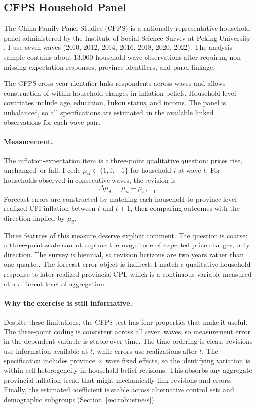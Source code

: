 \subsection{CFPS Household Panel}

The China Family Panel Studies (CFPS) is a nationally
representative household panel administered by the Institute
of Social Science Survey at Peking University
\citep{Xie2014,Xie2022}. I use seven waves (2010, 2012,
2014, 2016, 2018, 2020, 2022). The analysis sample contains
about 13,000 household-wave observations after requiring
non-missing expectation responses, province identifiers, and
panel linkage.

The CFPS cross-year identifier links respondents across
waves and allows construction of within-household changes in
inflation beliefs. Household-level covariates include age,
education, hukou status, and income. The panel is
unbalanced, so all specifications are estimated on the
available linked observations for each wave pair.

\paragraph{Measurement.}
The inflation-expectation item is a three-point qualitative
question: prices rise, unchanged, or fall. I code
$\mu_{it}\in\{1,0,-1\}$ for household $i$ at wave $t$. For
households observed in consecutive waves, the revision is
\begin{equation*}
\Delta \mu_{it}=\mu_{it}-\mu_{i,t-1}.
\end{equation*}
Forecast errors are constructed by matching each household
to province-level realized CPI inflation between $t$ and
$t+1$, then comparing outcomes with the direction implied by
$\mu_{it}$.

Three features of this measure deserve explicit comment.
The question is coarse: a three-point scale cannot
capture the magnitude of expected price changes, only
direction. The survey is biennial, so revision
horizons are two years rather than one quarter. The
forecast-error object is indirect: I match a qualitative
household response to later realized provincial CPI, which
is a continuous variable measured at a different level of
aggregation.

\paragraph{Why the exercise is still informative.}
Despite these limitations, the CFPS test has four properties
that make it useful. The three-point coding is consistent
across all seven waves, so measurement error in the
dependent variable is stable over time. The time ordering is
clean: revisions use information available at $t$, while
errors use realizations after $t$. The specification
includes province $\times$ wave fixed effects, so the
identifying variation is within-cell heterogeneity
in household belief revisions. This absorbs any aggregate
provincial inflation trend that might mechanically link
revisions and errors. Finally, the estimated coefficient is
stable across alternative control sets and demographic
subgroups (Section~\ref{sec:robustness}).

